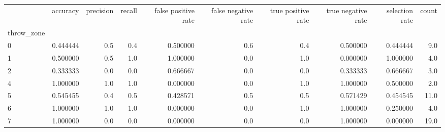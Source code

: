\begin{tabular}{lrrrrrrrrr}
\toprule
{} &  accuracy &  precision &  recall &  false positive rate &  false negative rate &  true positive rate &  true negative rate &  selection rate &  count \\
throw\_zone &           &            &         &                      &                      &                     &                     &                 &        \\
\midrule
0          &  0.444444 &        0.5 &     0.4 &             0.500000 &                  0.6 &                 0.4 &            0.500000 &        0.444444 &    9.0 \\
1          &  0.500000 &        0.5 &     1.0 &             1.000000 &                  0.0 &                 1.0 &            0.000000 &        1.000000 &    4.0 \\
2          &  0.333333 &        0.0 &     0.0 &             0.666667 &                  0.0 &                 0.0 &            0.333333 &        0.666667 &    3.0 \\
4          &  1.000000 &        1.0 &     1.0 &             0.000000 &                  0.0 &                 1.0 &            1.000000 &        0.500000 &    2.0 \\
5          &  0.545455 &        0.4 &     0.5 &             0.428571 &                  0.5 &                 0.5 &            0.571429 &        0.454545 &   11.0 \\
6          &  1.000000 &        1.0 &     1.0 &             0.000000 &                  0.0 &                 1.0 &            1.000000 &        0.250000 &    4.0 \\
7          &  1.000000 &        0.0 &     0.0 &             0.000000 &                  0.0 &                 0.0 &            1.000000 &        0.000000 &   19.0 \\
\bottomrule
\end{tabular}
